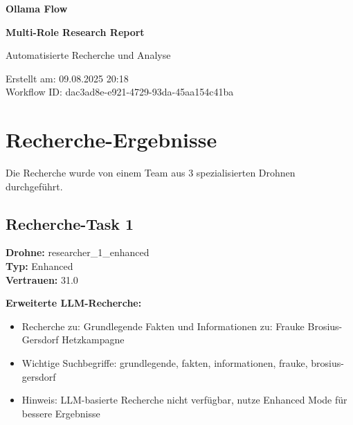 \documentclass[12pt,a4paper]{article}
\begin{document}
\begin{titlepage}
    \centering
    
    \vspace*{2cm}
    
    {\Huge\bfseries Ollama Flow}
    
    {\Huge\bfseries Multi-Role Research Report}
    
    \vspace{2cm}
    
    {\Large Automatisierte Recherche und Analyse}
    
    \vspace{3cm}
    
    
    \vspace{2cm}
    
    
    \vfill
    
    {\large
    Erstellt am: 09.08.2025 20:18\\
    Workflow ID: dac3ad8e-e921-4729-93da-45aa154c41ba
    }
    
\end{titlepage}

\newpage
\tableofcontents
\newpage

\section{Recherche-Ergebnisse}

Die Recherche wurde von einem Team aus 3 spezialisierten Drohnen durchgeführt.

\subsection{Recherche-Task 1}

\textbf{Drohne:} researcher\_1\_enhanced\\
\textbf{Typ:} Enhanced\\
\textbf{Vertrauen:} 31.0%

\textbf{Erweiterte LLM-Recherche:}
\begin{itemize}
\item Recherche zu: Grundlegende Fakten und Informationen zu: Frauke Brosius-Gersdorf Hetzkampagne
\item Wichtige Suchbegriffe: grundlegende, fakten, informationen, frauke, brosius-gersdorf
\item Hinweis: LLM-basierte Recherche nicht verfügbar, nutze Enhanced Mode für bessere Ergebnisse
\end{itemize}
\end{document}
